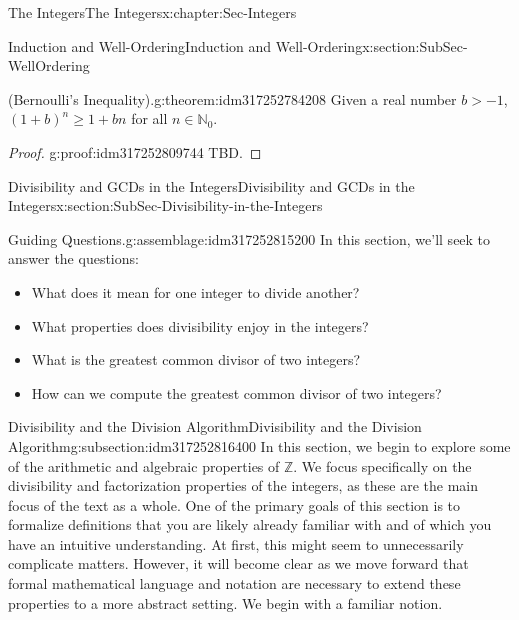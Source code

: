 \documentclass[oneside,10pt,]{book}
\numberwithin{equation}{section}
\renewcommand{\ge}{\geqslant}
\def\Z{{\mathbb Z}}
\def\N{{\mathbb N}}
\begin{document}
\begin{chapterptx}{The Integers}{}{The Integers}{}{}{x:chapter:Sec-Integers}
\begin{sectionptx}{Induction and Well-Ordering}{}{Induction and Well-Ordering}{}{}{x:section:SubSec-WellOrdering}
\begin{theorem}{(Bernoulli's Inequality).}{}{g:theorem:idm317252784208}%
Given a real number \(b > -1\), \((1+b)^n \ge 1 + bn\) for all \(n\in \N_0\).\end{theorem}
\begin{proof}{}{g:proof:idm317252809744}
TBD.\end{proof}
\end{sectionptx}
%
%
\typeout{************************************************}
\typeout{************************************************}
%
\begin{sectionptx}{Divisibility and GCDs in the Integers}{}{Divisibility and GCDs in the Integers}{}{}{x:section:SubSec-Divisibility-in-the-Integers}
\begin{assemblage}{Guiding Questions.}{g:assemblage:idm317252815200}%
In this section, we'll seek to answer the questions: %
\begin{itemize}[label=\textbullet]
\item{}What does it mean for one integer to divide another?%
\item{}What properties does divisibility enjoy in the integers?%
\item{}What is the greatest common divisor of two integers?%
\item{}How can we compute the greatest common divisor of two integers?%
\end{itemize}
%
\end{assemblage}
%
%
\typeout{************************************************}
\typeout{************************************************}
%
\begin{subsectionptx}{Divisibility and the Division Algorithm}{}{Divisibility and the Division Algorithm}{}{}{g:subsection:idm317252816400}
In this section, we begin to explore some of the arithmetic and algebraic properties of \(\Z\). We focus specifically on the divisibility and factorization properties of the integers, as these are the main focus of the text as a whole. One of the primary goals of this section is to formalize definitions that you are likely already familiar with and of which you have an intuitive understanding. At first, this might seem to unnecessarily complicate matters. However, it will become clear as we move forward that formal mathematical language and notation are necessary to extend these properties to a more abstract setting. We begin with a familiar notion.%

\end{subsectionptx}
\end{sectionptx}
\end{chapterptx}
\end{document}
